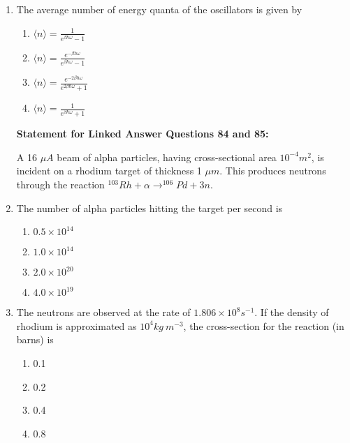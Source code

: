 \documentclass[journal]{IEEEtran}
\begin{document}
\begin{enumerate}[start=69]
\item The average number of energy quanta of the oscillators is given by
\begin{multicols}{4}
\begin{enumerate}
\item $\langle n \rangle = \frac{1}{e^{\beta\hbar\omega}-1}$
\item $\langle n \rangle = \frac{e^{-\beta\hbar\omega}}{e^{\beta\hbar\omega}-1}$
\item $\langle n \rangle = \frac{e^{-2\beta\hbar\omega}}{e^{2\beta\hbar\omega}+1}$
\item $\langle n \rangle = \frac{1}{e^{\beta\hbar\omega}+1}$
\end{enumerate}
\end{multicols}

 \textbf{Statement for Linked Answer Questions 84 and 85:}

A 16 $\mu A$ beam of alpha particles, having cross-sectional area $10^{-4}m^{2}$, is incident on a rhodium target of thickness 1 $\mu m$. This produces neutrons through the reaction $^{103}Rh + \alpha \rightarrow ^{106}Pd + 3n$.

\item The number of alpha particles hitting the target per second is
\begin{multicols}{4}
\begin{enumerate}
\item $0.5\times10^{14}$
\item $1.0\times10^{14}$
\item $2.0\times10^{20}$
\item $4.0\times10^{19}$
\end{enumerate}
\end{multicols}

\item The neutrons are observed at the rate of $1.806\times10^{8}s^{-1}$. If the density of rhodium is approximated as $10^{4}kg~m^{-3}$, the cross-section for the reaction (in barns) is
\begin{multicols}{4}
\begin{enumerate}
\item 0.1
\item 0.2
\item 0.4
\item 0.8
\end{enumerate}
\end{multicols}



\end{enumerate}
\end{document}
